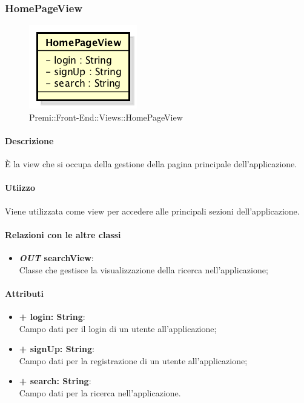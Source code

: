 \subsubsection{HomePageView}
	\begin{figure}[h]
		\centering
		\includegraphics[width=0.4\linewidth]{img/premi_front_end_views_homepageview}
		\caption[Premi::Front-End::Views::HomePageView]{Premi::Front-End::Views::HomePageView}
	\end{figure}
	
	\paragraph{Descrizione}
	È la view che si occupa della gestione della pagina principale dell'applicazione.
	
	\paragraph{Utiizzo}
	Viene utilizzata come view per accedere alle principali sezioni dell'applicazione.
	
	\paragraph{Relazioni con le altre classi}
	\begin{itemize}
		\item \textbf{\textit{OUT} searchView}:\\
		Classe che gestisce la visualizzazione della ricerca nell'applicazione;
	\end{itemize}
	
	\paragraph{Attributi}
	\begin{itemize}
		\item \textbf{+ login: String}:\\
		Campo dati per il login di un utente all'applicazione;
		\item \textbf{+ signUp: String}:\\
		Campo dati per la registrazione di un utente all'applicazione;
		\item \textbf{+ search: String}:\\
		Campo dati per la ricerca nell'applicazione.
	\end{itemize}
	
